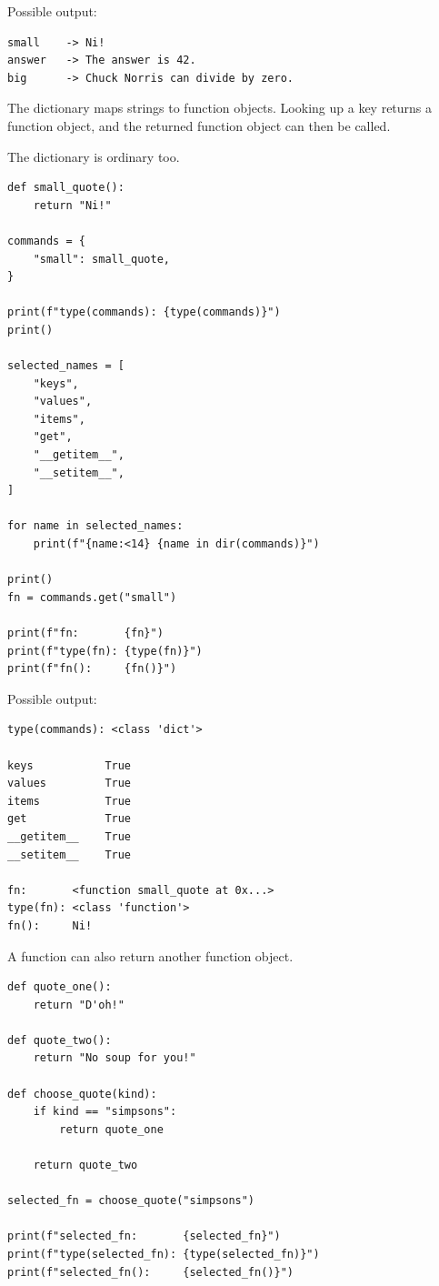 Possible output:

\begin{verbatim}
small    -> Ni!
answer   -> The answer is 42.
big      -> Chuck Norris can divide by zero.
\end{verbatim}

The dictionary maps strings to function objects. Looking up a key returns a function object, and the returned function object can then be called.

The dictionary is ordinary too.

\begin{verbatim}
def small_quote():
    return "Ni!"

commands = {
    "small": small_quote,
}

print(f"type(commands): {type(commands)}")
print()

selected_names = [
    "keys",
    "values",
    "items",
    "get",
    "__getitem__",
    "__setitem__",
]

for name in selected_names:
    print(f"{name:<14} {name in dir(commands)}")

print()
fn = commands.get("small")

print(f"fn:       {fn}")
print(f"type(fn): {type(fn)}")
print(f"fn():     {fn()}")
\end{verbatim}

Possible output:

\begin{verbatim}
type(commands): <class 'dict'>

keys           True
values         True
items          True
get            True
__getitem__    True
__setitem__    True

fn:       <function small_quote at 0x...>
type(fn): <class 'function'>
fn():     Ni!
\end{verbatim}

A function can also return another function object.

\begin{verbatim}
def quote_one():
    return "D'oh!"

def quote_two():
    return "No soup for you!"

def choose_quote(kind):
    if kind == "simpsons":
        return quote_one

    return quote_two

selected_fn = choose_quote("simpsons")

print(f"selected_fn:       {selected_fn}")
print(f"type(selected_fn): {type(selected_fn)}")
print(f"selected_fn():     {selected_fn()}")
\end{verbatim}

